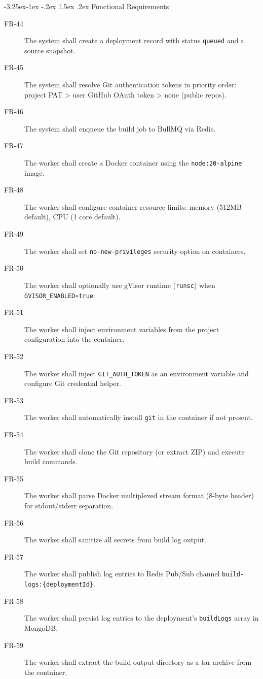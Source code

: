 \documentclass[12pt,a4paper]{article}
\makeatletter
\renewcommand\subsubsection{\@startsection{subsubsection}{3}{\z@}%
  {-3.25ex\@plus -1ex \@minus -.2ex}%
  {1.5ex \@plus .2ex}%
  {\normalfont\normalsize\bfseries}}
\makeatother
\begin{document}
\subsubsection{Functional Requirements}
\begin{description}
    \item[FR-44] The system shall create a deployment record with status \texttt{queued} and a source snapshot.
    \item[FR-45] The system shall resolve Git authentication tokens in priority order: project PAT > user GitHub OAuth token > none (public repos).
    \item[FR-46] The system shall enqueue the build job to BullMQ via Redis.
    \item[FR-47] The worker shall create a Docker container using the \texttt{node:20-alpine} image.
    \item[FR-48] The worker shall configure container resource limits: memory (512MB default), CPU (1 core default).
    \item[FR-49] The worker shall set \texttt{no-new-privileges} security option on containers.
    \item[FR-50] The worker shall optionally use gVisor runtime (\texttt{runsc}) when \texttt{GVISOR\_ENABLED=true}.
    \item[FR-51] The worker shall inject environment variables from the project configuration into the container.
    \item[FR-52] The worker shall inject \texttt{GIT\_AUTH\_TOKEN} as an environment variable and configure Git credential helper.
    \item[FR-53] The worker shall automatically install \texttt{git} in the container if not present.
    \item[FR-54] The worker shall clone the Git repository (or extract ZIP) and execute build commands.
    \item[FR-55] The worker shall parse Docker multiplexed stream format (8-byte header) for stdout/stderr separation.
    \item[FR-56] The worker shall sanitize all secrets from build log output.
    \item[FR-57] The worker shall publish log entries to Redis Pub/Sub channel \texttt{build\allowbreak{}-logs:\allowbreak{}\{deploymentId\}}.
    \item[FR-58] The worker shall persist log entries to the deployment's \texttt{buildLogs} array in MongoDB.
    \item[FR-59] The worker shall extract the build output directory as a tar archive from the container.

\end{description}
\end{document}
